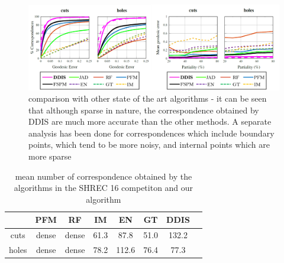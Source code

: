\documentclass[10pt,twocolumn,letterpaper]{article}
\begin{document}
\begin{figure}[htb]
	\centering

	\includegraphics[width=1\textwidth]{figures/ROCSHREC16.png}
	\caption{comparison with other state of the art algorithms - it can be seen that although sparse in nature, the correspondence obtained by DDIS are much more accurate than the other methods. 
		A separate analysis has been done for correspondences which include boundary points, which tend to be more noisy, and internal points which are more sparse}
\end{figure}

\begin{table}[h]
	\centering
	\begin{tabular}{c  c  c  c  c  c  c c} 
		\hline
		& PFM & RF & IM & EN & GT & DDIS  \\ \hline
		cuts & dense & dense & 61.3 & 87.8 & 51.0 & 132.2\\ \hline
		holes & dense & dense & 78.2 & 112.6 & 76.4 & 77.3 \\ \hline
		
	\end{tabular}
	\caption{mean number of correspondence obtained by the algorithms in the SHREC 16 competiton and our algorithm}
	\label{table:1}
\end{table}
\end{document}
